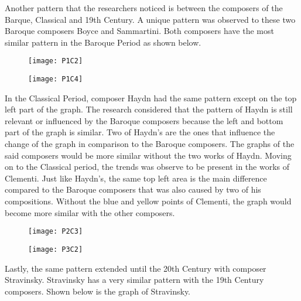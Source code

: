Another pattern that the researchers noticed is between the composers of the Barque, Classical and 19th Century. A unique pattern was observed to these two Baroque composers Boyce and Sammartini. Both composers have the most similar pattern in the Baroque Period as shown below.

\begin{figure}[!htb]
\begin{minipage}{.5\textwidth}
  \centering
  \texttt{[image: P1C2]}
  \label{fig:test2}
\end{minipage}
\begin{minipage}{.5\textwidth}
  \centering
  \texttt{[image: P1C4]}
  \label{fig:test2}
\end{minipage}
\end{figure}

In the Classical Period, composer Haydn had the same pattern except on the top left part of the graph. The research considered that the pattern of Haydn is still relevant or influenced by the Baroque composers because the left and bottom part of the graph is similar. Two of Haydn’s are the ones that influence the change of the graph in comparison to the Baroque composers. The graphs of the said composers would be more similar without the two works of Haydn. Moving on to the Classical period, the trends was observe to be present in the works of Clementi. Just like Haydn’s, the same top left area is the main difference compared to the Baroque composers that was also caused by two of his compositions. Without the blue and yellow points of Clementi, the graph would become more similar with the other composers.

\begin{figure}[!htb]
\begin{minipage}{.5\textwidth}
  \centering
  \texttt{[image: P2C3]}
  \label{fig:test1}
\end{minipage}
\begin{minipage}{.5\textwidth}
  \centering
  \texttt{[image: P3C2]}
  \label{fig:test2}
\end{minipage}
\end{figure}

Lastly, the same pattern extended until the 20th Century with composer Stravinsky. Stravinsky has a very similar pattern with the 19th Century composers. Shown below is the graph of Stravinsky.

